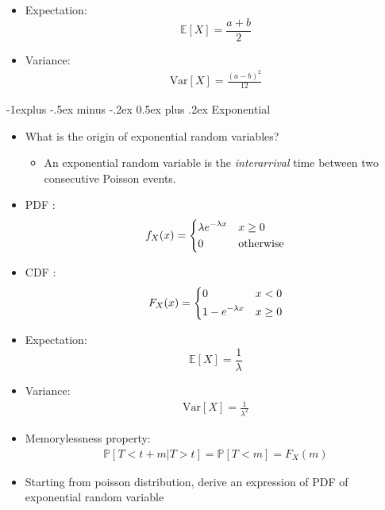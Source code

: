 \documentclass[a4paper]{article}
\makeatletter
\newcommand*\pp{\mathbb{P}}
\renewcommand{\subsection}{\@startsection{subsection}{2}{0mm}%
                                {-1explus -.5ex minus -.2ex}%
                                {0.5ex plus .2ex}%
                                {\normalfont\normalsize\bfseries}}
\makeatother
\begin{document}
\begin{multicols}{3}
\begin{itemize}
\item Expectation:
$$ \mathbb{E}[X] = \frac{a+b}{2} $$

\item Variance:
\begin{align*}
\text{Var}[X] = \frac{(a-b)^2}{12}
\end{align*}
\end{itemize}

\subsection{Exponential} 
\begin{itemize}

\item What is the origin of exponential random variables?
\begin{itemize}
\item An exponential random variable is the \emph{interarrival} time between two consecutive
Poisson events.

\end{itemize}

\item PDF :
$$ f_X(x) =
\begin{dcases}
\lambda e ^{-\lambda x} & x \geq 0\\
0 & \text{otherwise}\\
\end{dcases}
$$



\item CDF :
$$ F_X(x) =
\begin{dcases}
0 & x < 0\\
1- e^{-\lambda x} & x \geq 0\\
\end{dcases}
$$



\item Expectation:
$$ \mathbb{E}[X] = \frac{1}{\lambda} $$

\item Variance:
\begin{align*}
\text{Var}[X] = \frac{1}{\lambda^2}
\end{align*}

\item Memorylessness property:
\begin{align*}
\pp[T< t+m | T>t] = \pp[T<m] = F_X(m)
\end{align*}

\item Starting from poisson distribution, derive an expression of PDF of exponential random variable


\end{itemize}
\end{multicols}
\end{document}
